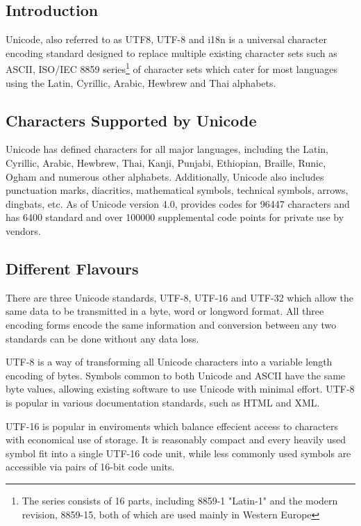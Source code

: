 
\subsection{Introduction}

Unicode, also referred to as UTF8, UTF-8 and i18n is a universal
character encoding standard designed to replace multiple existing
character sets such as ASCII, 
ISO/IEC 8859 series\footnote{The series consists of 16 parts, including 8859-1 "Latin-1" and the modern revision, 8859-15, both of which are used mainly in Western Europe}
of character sets which cater for most languages using the Latin, 
Cyrillic, Arabic, Hewbrew and Thai alphabets.

\subsection{Characters Supported by Unicode}

Unicode has defined characters for all major languages, including the
Latin, Cyrillic, Arabic, Hewbrew, Thai, Kanji, Punjabi, Ethiopian, 
Braille, Runic, Ogham and numerous other alphabets. Additionally,
Unicode also includes punctuation marks, diacritics, mathematical
symbols, technical symbols, arrows, dingbats, etc. As of Unicode version
4.0, provides codes for 96447 characters and has 6400 standard and over
100000 supplemental code points for private use by vendors.

\subsection{Different Flavours}

There are three Unicode standards, UTF-8, UTF-16 and UTF-32 which allow 
the same data to be transmitted in a byte, word or longword format. All
three encoding forms encode the same information and conversion between
any two standards can be done without any data loss.


UTF-8 is a way of transforming all Unicode characters into a variable
length encoding of bytes. Symbols common to both Unicode and ASCII have
the same byte values, allowing existing software to use Unicode with
minimal effort. UTF-8 is popular in various documentation standards, 
such as HTML and XML.


UTF-16 is popular in enviroments which balance effecient access to
characters with economical use of storage. It is reasonably compact and
every heavily used symbol fit into a single UTF-16 code unit, while
less commonly used symbols are accessible via pairs of 16-bit code
units.


